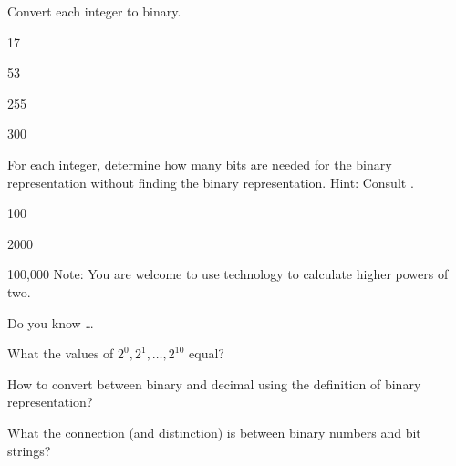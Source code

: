 \begin{exer}[\exerP] %
\label{exer_conv_to_binary}
    Convert each integer to binary.
        \begin{exerpart}
            \item 17
            \item 53
            \item 255
            \item 300
        \end{exerpart}  
\end{exer}

\begin{exer}[\exerU] %
\label{exer_count_bits_binary}
    For each integer, determine how many bits are needed for the binary representation without finding the binary representation. Hint: Consult .
        \begin{exerpart}
            \item 100
            \item 2000
            \item 100,000   Note: You are welcome to use technology to calculate higher powers of two.
        \end{exerpart}
\end{exer}

\begin{exer}[\exerR] %
\label{exer_dyk_binary_rep}
    Do you know \ldots
        \begin{exerpart}
            \item What the values of $2^0, 2^1, \ldots, 2^{10}$ equal?
            \item How to convert between binary and decimal using the definition of binary representation?
            \item What the connection (and distinction) is between binary numbers and bit strings?
        \end{exerpart}
\end{exer}

